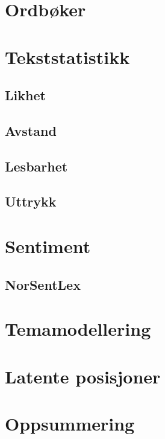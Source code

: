 \documentclass[
]{book}
\begin{document}
\hypertarget{ordboker}{%
\chapter{Ordbøker}\label{ordboker}}

\hypertarget{tekststats}{%
\chapter{Tekststatistikk}\label{tekststats}}

\hypertarget{likhet}{%
\section{Likhet}\label{likhet}}

\hypertarget{avstand}{%
\section{Avstand}\label{avstand}}

\hypertarget{lesbarhet}{%
\section{Lesbarhet}\label{lesbarhet}}

\hypertarget{uttrykk}{%
\section{Uttrykk}\label{uttrykk}}

\hypertarget{sentiment}{%
\chapter{Sentiment}\label{sentiment}}

\hypertarget{norsentlex}{%
\section{NorSentLex}\label{norsentlex}}

\hypertarget{topicmod}{%
\chapter{Temamodellering}\label{topicmod}}

\hypertarget{posisjon}{%
\chapter{Latente posisjoner}\label{posisjon}}

\hypertarget{oppsummering}{%
\chapter{Oppsummering}\label{oppsummering}}

  
\end{document}
